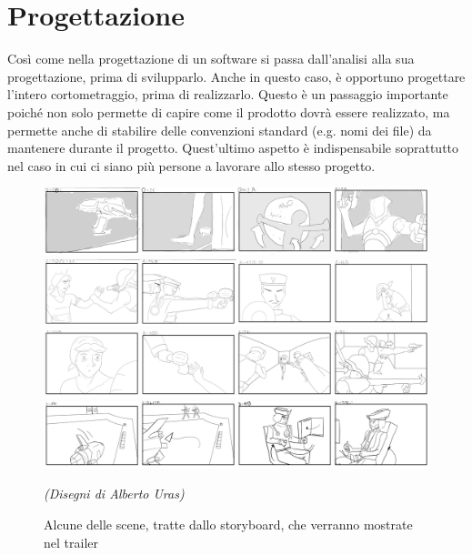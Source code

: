
\chapter{Progettazione} %

\label{Chapter4} %

Così come nella progettazione di un software si passa dall'analisi alla sua progettazione, prima di svilupparlo. Anche in questo caso, è opportuno progettare l'intero cortometraggio, prima di realizzarlo.
Questo è un passaggio importante poiché non solo permette di capire come il prodotto dovrà essere realizzato, ma permette anche di stabilire delle convenzioni standard (e.g. nomi dei file) da mantenere durante il progetto.
Quest'ultimo aspetto è indispensabile soprattutto nel caso in cui ci siano più persone a lavorare allo stesso progetto.

\begin{figure}[ht]
\centering
\includegraphics[width=.8\textwidth]{Figures/stripe1}\\[40px]
\includegraphics[width=.8\textwidth]{Figures/stripe2}\\[40px]
\includegraphics[width=.8\textwidth]{Figures/stripe3}\\[40px]
\includegraphics[width=.8\textwidth]{Figures/stripe4}\\[10px]
  \begin{minipage}{.8\textwidth}
  \footnotesize
  \emph{(Disegni di Alberto Uras)}
  \end{minipage}
\decoRule
\caption[Storyboard]{Alcune delle scene, tratte dallo storyboard, che verranno mostrate nel trailer}
\label{fig:story}
\end{figure}

